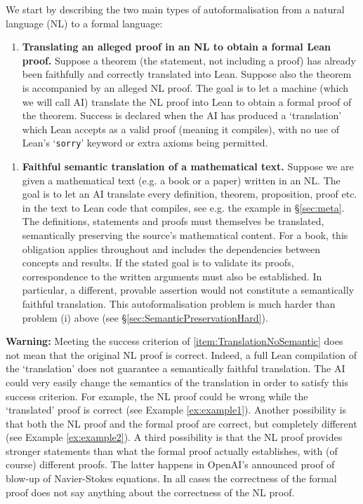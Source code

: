 \documentclass[10pt, a4paper, reqno]{amsart}
\numberwithin{equation}{section}
\theoremstyle{definition}
\theoremstyle{definition}
\begin{document}
We start by describing the two main types of autoformalisation from a natural language (NL) to a formal language:




\begin{enumerate}[label=(\roman*),leftmargin=16pt]
\item \label{item:TranslationNoSemantic}
\textbf{Translating an alleged proof in an NL to obtain a formal Lean proof.}
Suppose a theorem (the statement, not including a proof) has already been faithfully and correctly translated into Lean. Suppose also the theorem is accompanied by an alleged NL proof.   
The goal is to let a machine (which we will call AI) translate the NL proof into Lean to obtain a formal proof of the theorem. Success is declared when the AI has produced a `translation' which Lean accepts as a valid proof (meaning it compiles), with no use of Lean's `\texttt{sorry}' keyword or extra axioms being permitted. 
\end{enumerate}


\begin{enumerate}[label=(\roman*),leftmargin=16pt,resume]
\item \label{item:TranslationSemantic}
\textbf{Faithful semantic translation of a mathematical text.}
Suppose we are given a mathematical text (e.g. a book or a paper) written in an NL. The goal is to let an AI translate every definition, theorem, proposition, proof etc. in the text to Lean code that compiles, see e.g. the example in \S \ref{sec:meta}. The definitions, statements and proofs must themselves be translated, semantically preserving the
source's mathematical content. For a book, this obligation applies throughout and includes the dependencies between concepts and results.
If the stated goal is to validate its proofs, correspondence to the written
arguments must also be established. In particular, a different, provable assertion would not constitute a semantically faithful translation. This autoformalisation problem is much harder than problem (i) above (see \S \ref{sec:SemanticPreservationHard}).
\end{enumerate}
{\bf Warning:} Meeting the success criterion of \ref{item:TranslationNoSemantic} does not mean that the original NL proof is correct. Indeed, a full Lean compilation of the `translation' does not guarantee a semantically faithful translation. The AI could very easily change the semantics of the translation in order to satisfy this success criterion. For example, the NL proof could be wrong while the `translated' proof is correct (see Example \ref{ex:example1}). Another possibility is that both the NL proof and the formal proof are correct, but completely different (see Example \ref{ex:example2}). A third possibility is that the NL proof provides stronger statements than what the formal proof actually establishes, with (of course) different proofs. The latter happens in OpenAI's announced proof of blow-up of Navier-Stokes equations. In all cases the correctness of the formal proof does not say anything about the correctness of the NL proof.  
\end{document}
